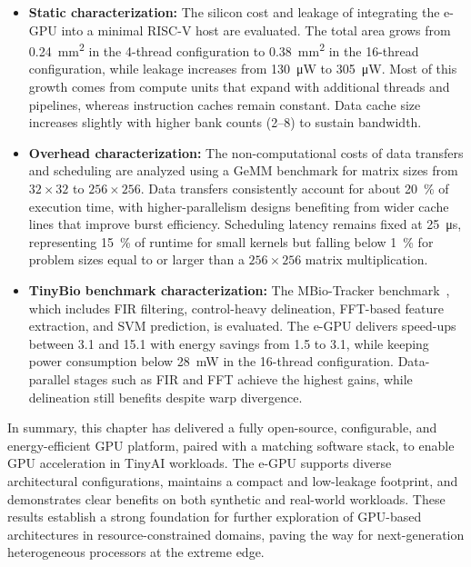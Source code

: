        \begin{itemize}
            \item \textbf{Static characterization:} The silicon cost and leakage of integrating the \mbox{e-GPU} into a minimal RISC-V host are evaluated. The total area grows from \SI{0.24}{\milli\meter\squared} in the 4-thread configuration to \SI{0.38}{\milli\meter\squared} in the 16-thread configuration, while leakage increases from \SI{130}{\micro\watt} to \SI{305}{\micro\watt}. Most of this growth comes from compute units that expand with additional threads and pipelines, whereas instruction caches remain constant. Data cache size increases slightly with higher bank counts (2–8) to sustain bandwidth.
        
            \item \textbf{Overhead characterization:} The non-computational costs of data transfers and scheduling are analyzed using a GeMM benchmark for matrix sizes from $32 \times 32$ to $256 \times 256$. Data transfers consistently account for about \SI{20}{\percent} of execution time, with higher-parallelism designs benefiting from wider cache lines that improve burst efficiency. Scheduling latency remains fixed at \SI{25}{\micro\second}, representing \SI{15}{\percent} of runtime for small kernels but falling below \SI{1}{\percent} for problem sizes equal to or larger than a $256 \times 256$ matrix multiplication.
        
            \item \textbf{TinyBio benchmark characterization:} The MBio-Tracker benchmark~\cite{mbio_tracker}, which includes FIR filtering, control-heavy delineation, FFT-based feature extraction, and SVM prediction, is evaluated. The \mbox{e-GPU} delivers speed-ups between \SI{3.1}{\times} and \SI{15.1}{\times} with energy savings from \SI{1.5}{\times} to \SI{3.1}{\times}, while keeping power consumption below \SI{28}{\milli\watt} in the 16-thread configuration. Data-parallel stages such as FIR and FFT achieve the highest gains, while delineation still benefits despite warp divergence.
        \end{itemize}
    
        In summary, this chapter has delivered a fully open-source, configurable, and energy-efficient GPU platform, paired with a matching software stack, to enable GPU acceleration in TinyAI workloads. The \mbox{e-GPU} supports diverse architectural configurations, maintains a compact and low-leakage footprint, and demonstrates clear benefits on both synthetic and real-world workloads. These results establish a strong foundation for further exploration of GPU-based architectures in resource-constrained domains, paving the way for next-generation heterogeneous processors at the extreme edge.
